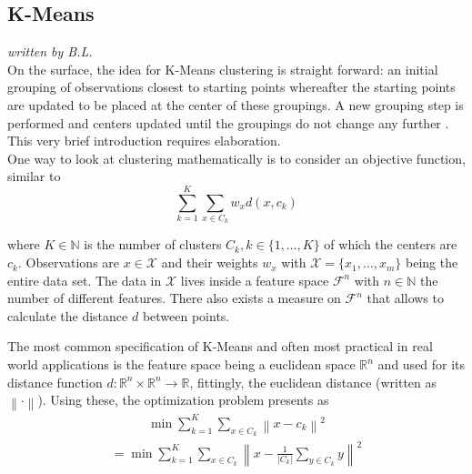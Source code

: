\subsection{K-Means}
\textit{written by B.L.}\\

\label{subsec:method_kmeans}
On the surface, the idea for K-Means clustering is straight forward: an initial grouping of observations closest to starting points whereafter the starting points are updated to be placed at the center of these groupings. A new grouping step is performed and centers updated until the groupings do not change any further \cite{wiedenbeck2001klassifikation, fahrmeir2015multivariate}. This very brief introduction requires elaboration.\\

One way to look at clustering mathematically is to consider an objective function, similar to \cite{wu2012advances}
\begin{equation}
    \sum_{k=1}^{K}\sum_{x \in C_{k}}^{} w_{x}d(x, c_{k})
\end{equation}

where $K \in \mathbb{N}$ is the number of clusters $C_{k}, k \in \{ 1,\dots,K \}$ of which the centers are $c_{k}$. Observations are $x \in \mathcal{X}$ and their weights $w_{x}$ with $\mathcal{X} = \{ x_{1}, \dots, x_{m} \}$ being the entire data set. The data in $\mathcal{X}$ lives inside a feature space $\mathcal{F}^{n}$ with $n \in \mathbb{N}$ the number of different features. There also exists a measure on $\mathcal{F}^{n}$ that allows to calculate the distance $d$ between points. 

The most common specification of K-Means and often most practical in real world applications is the feature space being a euclidean space $\mathbb{R}^{n}$ and used for its distance function $d: \mathbb{R}^{n} \times \mathbb{R}^{n} \rightarrow \mathbb{R}$, fittingly, the euclidean distance (written as $\left \| \cdot \right \|$). Using these, the optimization problem presents as
\begin{equation}
\begin{gathered}
    \min \sum_{k=1}^{K}\sum_{x \in C_{k}}^{} \left \| x - c_{k} \right \|^2
\end{gathered}\label{eqn:kmeans_basic}
\end{equation}
\begin{equation}
\begin{gathered}
    = \min \sum_{k=1}^{K}\sum_{x \in C_{k}}^{} \left \| x - \frac{1}{\left | C_{k} \right |} \sum_{y \in C_{k}}^{} y  \right \|^2
\end{gathered}\label{eq:kmeans_basic_other}
\end{equation}

